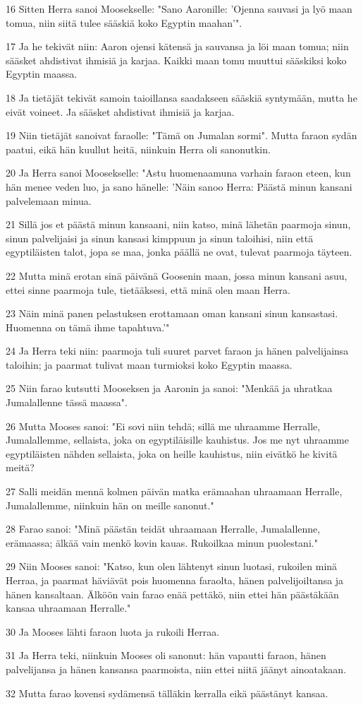 \par 16 Sitten Herra sanoi Moosekselle: "Sano Aaronille: 'Ojenna sauvasi ja lyö maan tomua, niin siitä tulee sääskiä koko Egyptin maahan'".
\par 17 Ja he tekivät niin: Aaron ojensi kätensä ja sauvansa ja löi maan tomua; niin sääsket ahdistivat ihmisiä ja karjaa. Kaikki maan tomu muuttui sääskiksi koko Egyptin maassa.
\par 18 Ja tietäjät tekivät samoin taioillansa saadakseen sääskiä syntymään, mutta he eivät voineet. Ja sääsket ahdistivat ihmisiä ja karjaa.
\par 19 Niin tietäjät sanoivat faraolle: "Tämä on Jumalan sormi". Mutta faraon sydän paatui, eikä hän kuullut heitä, niinkuin Herra oli sanonutkin.
\par 20 Ja Herra sanoi Moosekselle: "Astu huomenaamuna varhain faraon eteen, kun hän menee veden luo, ja sano hänelle: 'Näin sanoo Herra: Päästä minun kansani palvelemaan minua.
\par 21 Sillä jos et päästä minun kansaani, niin katso, minä lähetän paarmoja sinun, sinun palvelijaisi ja sinun kansasi kimppuun ja sinun taloihisi, niin että egyptiläisten talot, jopa se maa, jonka päällä ne ovat, tulevat paarmoja täyteen.
\par 22 Mutta minä erotan sinä päivänä Goosenin maan, jossa minun kansani asuu, ettei sinne paarmoja tule, tietääksesi, että minä olen maan Herra.
\par 23 Näin minä panen pelastuksen erottamaan oman kansani sinun kansastasi. Huomenna on tämä ihme tapahtuva.'"
\par 24 Ja Herra teki niin: paarmoja tuli suuret parvet faraon ja hänen palvelijainsa taloihin; ja paarmat tulivat maan turmioksi koko Egyptin maassa.
\par 25 Niin farao kutsutti Mooseksen ja Aaronin ja sanoi: "Menkää ja uhratkaa Jumalallenne tässä maassa".
\par 26 Mutta Mooses sanoi: "Ei sovi niin tehdä; sillä me uhraamme Herralle, Jumalallemme, sellaista, joka on egyptiläisille kauhistus. Jos me nyt uhraamme egyptiläisten nähden sellaista, joka on heille kauhistus, niin eivätkö he kivitä meitä?
\par 27 Salli meidän mennä kolmen päivän matka erämaahan uhraamaan Herralle, Jumalallemme, niinkuin hän on meille sanonut."
\par 28 Farao sanoi: "Minä päästän teidät uhraamaan Herralle, Jumalallenne, erämaassa; älkää vain menkö kovin kauas. Rukoilkaa minun puolestani."
\par 29 Niin Mooses sanoi: "Katso, kun olen lähtenyt sinun luotasi, rukoilen minä Herraa, ja paarmat häviävät pois huomenna faraolta, hänen palvelijoiltansa ja hänen kansaltaan. Älköön vain farao enää pettäkö, niin ettei hän päästäkään kansaa uhraamaan Herralle."
\par 30 Ja Mooses lähti faraon luota ja rukoili Herraa.
\par 31 Ja Herra teki, niinkuin Mooses oli sanonut: hän vapautti faraon, hänen palvelijansa ja hänen kansansa paarmoista, niin ettei niitä jäänyt ainoatakaan.
\par 32 Mutta farao kovensi sydämensä tälläkin kerralla eikä päästänyt kansaa.

